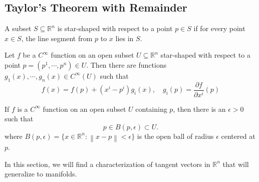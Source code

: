 \documentclass[en, oneside]{vivi}
\begin{document}
\subsection{Taylor's Theorem with Remainder}
\begin{dfn}
    A subset $S \subseteq \mathbb{R}^n$ is star-shaped with respect to a point $p \in S$ if for every point $x \in S$, the line segment from $p$ to $x$ lies in $S$. 
\end{dfn}
\begin{lem}
    Let $f$ be a $C^\infty$ function on an open subset $U \subseteq \mathbb{R}^n$ star-shaped with respect to a point $p = (p^1, \cdots, p^n) \in U$. 
    Then there are functions $g_1(x), \cdots, g_n(x) \in C^\infty(U)$ such that
    \begin{equation*}
        f(x) = f(p) + (x^i - p^i) g_i(x), \quad g_i(p) = \frac{\partial f}{\partial x^i}(p) 
    \end{equation*}
\end{lem}
If $f$ is a $C^\infty$ function on an open subset $U$ containing $p$, then there is an $\epsilon > 0$ such that 
\begin{equation*}
    p \in B(p, \epsilon) \subset U.
\end{equation*}
where $B(p, \epsilon) = \{ x \in \mathbb{R}^n : \left\lVert x-p \right\rVert < \epsilon \}$ is the open ball of radius $\epsilon$ centered at $p$.

In this section, we will find a characterization of tangent vectors in $\mathbb{R}^n$ that will generalize to manifolds.
\end{document}
